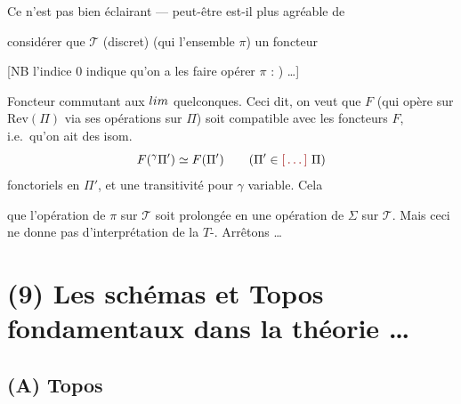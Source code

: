 \documentclass[11pt,a4paper]{article}
\begin{document}
Ce n'est pas bien éclairant --- peut-être est-il plus agréable de


considérer que  $\mathcal{T}$ (discret) (qui \ill{}
l'ensemble $\pi$) \ill{} un foncteur



[NB l'indice $0$ indique qu'on a  les \ill{} \ill{} \ill{}
\ill{} faire opérer $\pi$ : \ill{}) \ldots]

Foncteur \ill{} \ill{} commutant aux $\varinjlim$ quelconques. Ceci dit, on
veut que $F$ (qui opère sur $\mathrm{Rev}(\Pi)$ via ses opérations sur $\Pi$)
soit compatible avec les foncteurs $F$, i.e.\ qu'on ait des isom.
\[
  F({}^{\gamma}\Pi') \simeq F(\Pi') \qquad (\Pi' \in \ill{}\ \Pi)
\]
fonctoriels en $\Pi'$, et une transitivité pour $\gamma$ variable. Cela
\ill{} \ill{} \ill{}

que l'opération de $\pi$ sur $\mathcal{T}$ soit prolongée en une opération de
$\Sigma$ sur $\mathcal{T}$. Mais ceci ne donne pas d'interprétation
\ill{} de la $T$-\ill{}. Arrêtons \ldots

\section*{(9) Les schémas et Topos fondamentaux dans la théorie \ldots}


\subsection*{(A)  Topos }

\end{document}

